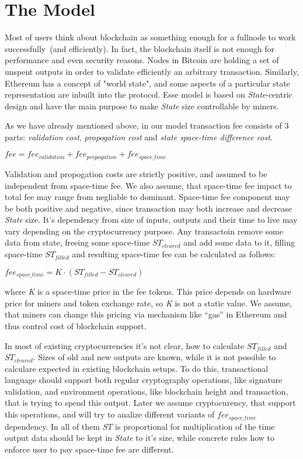 \documentclass[]{article}   %
\newcommand{\authnote}[2]{\marginpar{\parbox{\marginparwidth}{\tiny %
  \textsf{#1 {\textcolor{blue}{notes: #2}}}}}%
  \textcolor{blue}{\textbf{\dag}}}
\newcommand{\authnote}[2]{
  \textsf{#1 \textcolor{blue}{: #2}}}
\newcommand{\authnote}[2]{}
\newcommand{\dnote}[1]{{\authnote{\textcolor{blue}{Dima notes}}{#1}}}
\newcommand{\esse}{Esse}
\newcommand{\state}{\textit{State}}
\begin{document}
\dnote{write somewhere about lost coins and deflation}

\section{The Model}
\label{sec:model}

Most of users think about blockchain as something enough for a fullnode to work successfully~(and efficiently). In fact, the blockchain itself is not enough for performance and even security reasons. Nodes in Bitcoin are holding a set of unspent outputs in order to validate efficiently an arbitrary transaction. Similarly, Ethereum\cite{ethyp} has a concept of "world state", and some aspects of a particular state representation are inbuilt into the protocol. \esse{} model is based on \state{}-centric design and have the main purpose to make \state{} size controllable by miners.

As we have already mentioned above, in our model transaction fee consists of 3 parts: \textit{validation cost}, \textit{propogation cost} and \textit{state space-time difference cost}.

$fee = fee_{validation} + fee_{propogation} + fee_{space\_time}$ \dnote{should we require from total fee to be positive?}

Validation and propogation costs are strictly positive, and assumed to be independent from space-time fee. We also assume, that space-time fee impact to total fee may range from negliable to dominant. Space-time fee component may be both positive and negative, since transaction may both increase and decrease \state{} size. It's dependency from size of inputs, outputs and their time to live may vary depending on the cryptocurrency purpose. Any transactoin remove some data from state, freeing some space-time \textit{$ST_{cleared}$} and add some data to it, filling space-time \textit{$ST_{filled}$} and resulting space-time fee can be calculated as follows:

$fee_{space\_time} = K \cdot (ST_{filled} - ST_{cleared})$

where \textit{K} is a space-time price in the fee tokens. This price depends on hardware price for miners and token exchange rate, so \textit{K} is not a static value. We assume, that miners can change this pricing via mechanism like ``gas'' in Ethereum and thus control cost of blockchain support.

In most of existing cryptocurrencies it's not clear, how to calculate \textit{$ST_{filled}$} and \textit{$ST_{cleared}$}. Sizes of old and new outputs are known, while it is not possible to calculare expected in existing blockchain setups. To do this, transactional language should support both regular cryptography operations, like signature validation, and environment operations, like blockchain height and transaction, that is trying to spend this output. Later we assume cryptocurency, that support this operations, and will try to analize different variants of \textit{$fee_{space\_time}$} dependency. In all of them \textit{$ST$} is proportional for multiplication of the time output data should be kept in \state{} to it's size, while concrete rules how to enforce user to pay space-time fee are different.
\end{document}
